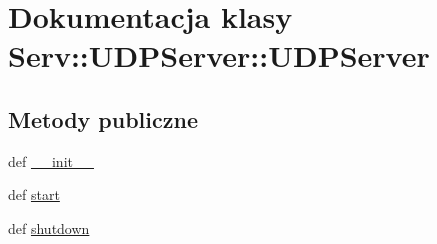 \hypertarget{class_serv_1_1_u_d_p_server_1_1_u_d_p_server}{
\section{Dokumentacja klasy Serv::UDPServer::UDPServer}
\label{class_serv_1_1_u_d_p_server_1_1_u_d_p_server}
}
\subsection*{Metody publiczne}
\begin{DoxyCompactItemize}
\item 
def \hyperlink{class_serv_1_1_u_d_p_server_1_1_u_d_p_server_a08fcc38fca5727c085acc11c9df7f512}{\_\-\_\-init\_\-\_\-}
\item 
def \hyperlink{class_serv_1_1_u_d_p_server_1_1_u_d_p_server_a9feda8e8dfee13803aa3fd07ddd003a1}{start}
\item 
def \hyperlink{class_serv_1_1_u_d_p_server_1_1_u_d_p_server_a43b3b2016322a79953939e56653d226d}{shutdown}
\end{DoxyCompactItemize}

